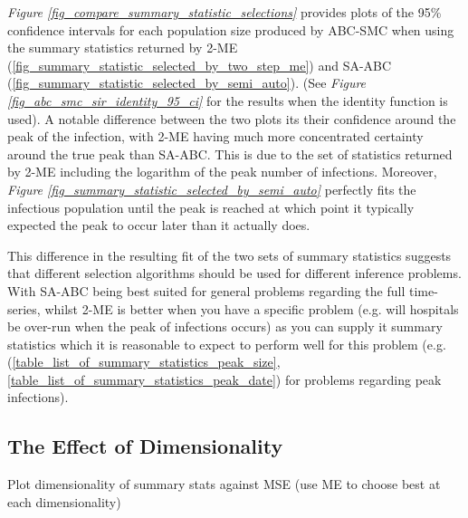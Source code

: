 \documentclass[11pt,a4paper]{article}
\theoremstyle{break}
\begin{document}
  \textit{Figure \ref{fig_compare_summary_statistic_selections}} provides plots of the 95\% confidence intervals for each population size produced by ABC-SMC when using the summary statistics returned by 2-ME (\ref{fig_summary_statistic_selected_by_two_step_me}) and SA-ABC (\ref{fig_summary_statistic_selected_by_semi_auto}). (See \textit{Figure \ref{fig_abc_smc_sir_identity_95_ci}} for the results when the identity function is used). A notable difference between the two plots its their confidence around the peak of the infection, with 2-ME having much more concentrated certainty around the true peak than SA-ABC. This is due to the set of statistics returned by 2-ME including the logarithm of the peak number of infections. Moreover, \textit{Figure \ref{fig_summary_statistic_selected_by_semi_auto}} perfectly fits the infectious population until the peak is reached at which point it typically expected the peak to occur later than it actually does.

  \par This difference in the resulting fit of the two sets of summary statistics suggests that different selection algorithms should be used for different inference problems. With SA-ABC being best suited for general problems regarding the full time-series, whilst 2-ME is better when you have a specific problem (e.g. will hospitals be over-run when the peak of infections occurs) as you can supply it summary statistics which it is reasonable to expect to perform well for this problem (e.g. (\ref{table_list_of_summary_statistics_peak_size},\ref{table_list_of_summary_statistics_peak_date}) for problems regarding peak infections).

\subsection{The Effect of Dimensionality}\label{sec_effect_of_dimensionality}

  Plot dimensionality of summary stats against MSE (use ME to choose best at each dimensionality)
\end{document}
